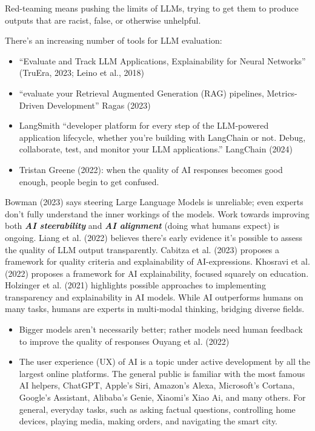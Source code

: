 \documentclass[
  letterpaper,
  DIV=11,
  numbers=noendperiod]{scrartcl}
\begin{document}
Red-teaming means pushing the limits of LLMs, trying to get them to
produce outputs that are racist, false, or otherwise unhelpful.

There's an increasing number of tools for LLM evaluation:

\begin{itemize}
\item
  ``Evaluate and Track LLM Applications, Explainability for Neural
  Networks'' (TruEra, 2023; Leino et al., 2018)
\item
  ``evaluate your Retrieval Augmented Generation (RAG) pipelines,
  Metrics-Driven Development'' Ragas (2023)
\item
  LangSmith ``developer platform for every step of the LLM-powered
  application lifecycle, whether you're building with LangChain or not.
  Debug, collaborate, test, and monitor your LLM applications.''
  LangChain (2024)
\item
  Tristan Greene (2022): when the quality of AI responses becomes good
  enough, people begin to get confused.
\end{itemize}

Bowman (2023) says steering Large Language Models is unreliable; even
experts don't fully understand the inner workings of the models. Work
towards improving both \textbf{\emph{AI steerability}} and
\textbf{\emph{AI alignment}} (doing what humans expect) is ongoing.
Liang et al. (2022) believes there's early evidence it's possible to
assess the quality of LLM output transparently. Cabitza et al. (2023)
proposes a framework for quality criteria and explainability of
AI-expressions. Khosravi et al. (2022) proposes a framework for AI
explainability, focused squarely on education. Holzinger et al. (2021)
highlights possible approaches to implementing transparency and
explainability in AI models. While AI outperforms humans on many tasks,
humans are experts in multi-modal thinking, bridging diverse fields.

\begin{itemize}
\item
  Bigger models aren't necessarily better; rather models need human
  feedback to improve the quality of responses Ouyang et al. (2022)
\item
  The user experience (UX) of AI is a topic under active development by
  all the largest online platforms. The general public is familiar with
  the most famous AI helpers, ChatGPT, Apple's Siri, Amazon's Alexa,
  Microsoft's Cortana, Google's Assistant, Alibaba's Genie, Xiaomi's
  Xiao Ai, and many others. For general, everyday tasks, such as asking
  factual questions, controlling home devices, playing media, making
  orders, and navigating the smart city.
\end{itemize}
\end{document}
